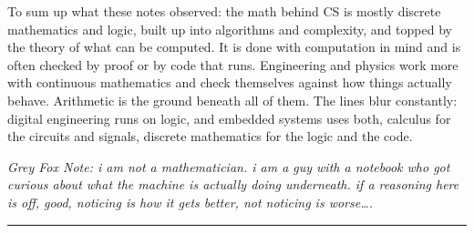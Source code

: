 \documentclass[11pt,a4paper]{article}
\newcommand{\gfnote}[1]{\par{\itshape Grey Fox Note: #1}\par}
\begin{document}
To sum up what these notes observed: the math behind CS is mostly discrete mathematics and
logic, built up into algorithms and complexity, and topped by the theory of what can be
computed. It is done with computation in mind and is often checked by proof or by code that
runs. Engineering and physics work more with continuous mathematics and check themselves
against how things actually behave. Arithmetic is the ground beneath all of them. The lines
blur constantly: digital engineering runs on logic, and embedded systems uses both, calculus
for the circuits and signals, discrete mathematics for the logic and the code.

\newpage %
\gfnote{i am not a mathematician. i am a guy with a notebook who got curious about
what the machine is actually doing underneath. if a reasoning here is off, good, noticing is how
it gets better, not noticing is worse\ldots.}

\noindent\rule{\textwidth}{0.6pt}
\end{document}
